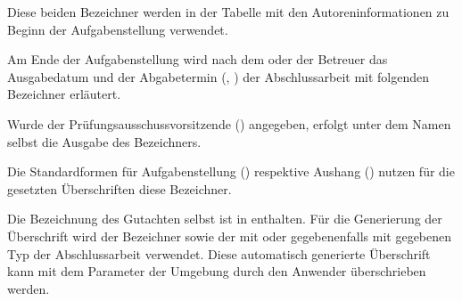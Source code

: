 \begin{Entity*}{}
\begin{Declaration}[v2.04]{}
\begin{Declaration}{}
\printdeclarationlist%
%
Diese beiden Bezeichner werden in der Tabelle mit den Autoreninformationen zu 
Beginn der Aufgabenstellung verwendet.
%
\end{Declaration}
\end{Declaration}

\begin{Declaration}{}
\begin{Declaration}{}
\printdeclarationlist%
%
Am Ende der Aufgabenstellung wird nach dem oder der Betreuer das Ausgabedatum 
und der Abgabetermin (, ) der Abschlussarbeit 
mit folgenden Bezeichner erläutert.
%
\end{Declaration}
\end{Declaration}

\begin{Declaration}{}
\printdeclarationlist%
%
Wurde der Prüfungsausschussvorsitzende () angegeben, erfolgt 
unter dem Namen selbst die Ausgabe des Bezeichners.
%
\end{Declaration}

\begin{Declaration}{}
\begin{Declaration}{}
\printdeclarationlist%
%
Die Standardformen für Aufgabenstellung () respektive Aushang 
() nutzen für die gesetzten Überschriften diese Bezeichner.
%
\end{Declaration}
\end{Declaration}

\begin{Declaration}{}
\begin{Declaration}{}
\printdeclarationlist%
%
Die Bezeichnung des Gutachten selbst ist in  enthalten. 
Für die Generierung der Überschrift wird der Bezeichner  
sowie der mit  oder gegebenenfalls mit  gegebenen 
Typ der Abschlussarbeit verwendet. Diese automatisch generierte Überschrift 
kann mit dem Parameter  der 
Umgebung  durch den Anwender überschrieben werden.
%
\end{Declaration}
\end{Declaration}


\end{Entity*}
